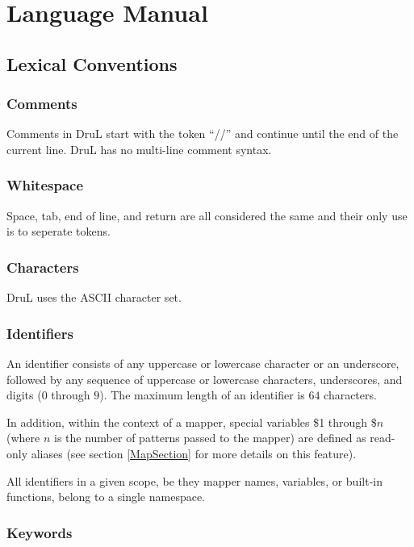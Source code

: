 \section{Language Manual}

\subsection{Lexical Conventions}

\subsubsection{Comments}

Comments in DruL start with the token ``//'' and continue until the end of the current line.
DruL has no multi-line comment syntax.

\subsubsection{Whitespace}

Space, tab, end of line, and return are all considered the same 
and their only use is to seperate tokens.

\subsubsection{Characters}

DruL uses the ASCII character set.

\subsubsection{Identifiers}

An identifier consists of any uppercase or lowercase character
or an underscore, followed by any sequence of uppercase or lowercase characters,
underscores, and digits ($0$ through $9$). The maximum length of an identifier
is $64$ characters.

In addition, within the context of a mapper, special variables \$1 through \$$n$ (where $n$ is the number of patterns passed to the mapper) are defined as read-only aliases (see section \ref{MapSection} for more details on this feature).

All identifiers in a given scope, be they mapper names, variables, or built-in functions, belong to a single namespace.

\subsubsection{Keywords}


